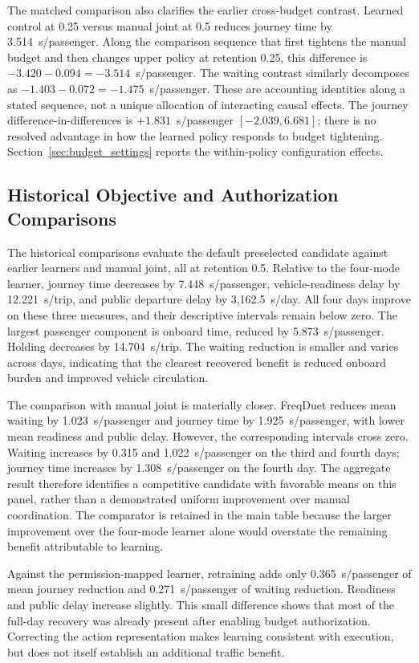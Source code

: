 The matched comparison also clarifies the earlier cross-budget contrast.
Learned control at 0.25 versus manual joint at 0.5 reduces journey time by
3.514~s/passenger. Along the comparison sequence that first tightens the
manual budget and then changes upper policy at retention 0.25, this difference
is $-3.420-0.094=-3.514$~s/passenger. The waiting contrast similarly decomposes
as $-1.403-0.072=-1.475$~s/passenger. These are accounting identities along a
stated sequence, not a unique allocation of interacting causal effects.
The journey difference-in-differences is $+1.831$~s/passenger
$[-2.039,6.681]$; there is no resolved advantage in how the learned policy
responds to budget tightening. Section~\ref{sec:budget_settings} reports the
within-policy configuration effects.

\subsection{Historical Objective and Authorization Comparisons}

The historical comparisons evaluate the default preselected candidate
against earlier learners and manual joint, all at retention 0.5.
Relative to the four-mode learner, journey
time decreases by 7.448~s/passenger, vehicle-readiness delay by
12.221~s/trip, and public departure delay by 3,162.5~s/day. All four days improve
on these three measures, and their descriptive intervals remain below zero.
The largest passenger component is onboard time, reduced by
5.873~s/passenger. Holding decreases by 14.704~s/trip. The waiting reduction is
smaller and varies across days, indicating that the clearest recovered benefit
is reduced onboard burden and improved vehicle circulation.

The comparison with manual joint is materially closer. FreqDuet reduces mean
waiting by 1.023~s/passenger and journey time by 1.925~s/passenger, with lower
mean readiness and public delay. However, the corresponding intervals cross
zero. Waiting increases by 0.315 and 1.022~s/passenger on the third and fourth
days; journey time increases by 1.308~s/passenger on the fourth day. The
aggregate result therefore identifies a competitive candidate with favorable
means on this panel, rather than a demonstrated uniform improvement over
manual coordination. The comparator is retained in the main table because the
larger improvement over the four-mode learner alone would overstate the
remaining benefit attributable to learning.

Against the permission-mapped learner, retraining adds only
0.365~s/passenger of mean journey reduction and 0.271~s/passenger of waiting
reduction. Readiness and public delay increase slightly. This small difference
shows that most of the full-day recovery was already present after enabling
budget authorization. Correcting the action representation makes learning
consistent with execution, but does not itself establish an additional traffic
benefit.

